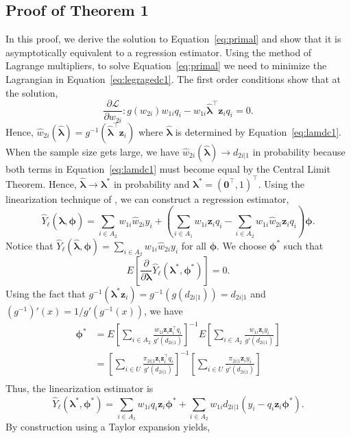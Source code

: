\documentclass[12pt]{article}
\renewcommand{\bf}[1]{\mathbf{#1}}
\begin{document}
\subsection{Proof of Theorem 1}

In this proof, we derive the solution to Equation~\ref{eq:primal} and show
that it is asymptotically equivalent to a regression estimator. Using the
method of Lagrange multipliers, to solve Equation~\eqref{eq:primal} we need to
minimize the Lagrangian in Equation~\eqref{eq:legragedc1}. 
The first order conditions show that at the solution,
$$
\frac{\partial \mathcal{L}}{\partial w_{2i}}: g(w_{2i}) w_{1i}q_i -
w_{1i} \hat{\bm \lambda}^\top \bf z_i q_i = 0.
$$
Hence, $\hat w_{2i}(\hat{\bm \lambda}) = 
g^{-1}(\hat{\bm \lambda}^\top \bf z_i)$ where
$\hat{\bm \lambda}$ is determined by Equation~\eqref{eq:lamdc1}. When the
sample size gets large, we have $\hat w_{2i}(\hat{\bm \lambda}) \to
d_{2i|1}$ in probability because both terms in Equation~\eqref{eq:lamdc1} must
become equal by the Central Limit Theorem. Hence,
$\hat{\bm \lambda} \to \bm \lambda^*$ in probability and 
$\bm \lambda^* = (\bf 0^\top, 1)^\top$. 
Using the linearization technique of
\cite{randles1982asymptotic}, we can construct a regression estimator, 
$$
\hat Y_\ell(\hat{\bm \lambda}, \bm \phi) = 
\sum_{i \in A_2} w_{1i} \hat w_{2i} y_i + 
\left(\sum_{i \in A_1} w_{1i} \bm z_i q_i - \sum_{i \in A_2} w_{1i} 
\hat w_{2i} \bf z_i q_i\right)\bm \phi.
$$
Notice that $\hat Y_\ell(\hat{\bm \lambda}, \bm \phi) = \sum_{i \in A_2} w_{1i}
\hat w_{2i} y_i$ for all $\bm \phi$. We choose $\bm \phi^*$ such that
$$
E\left[\frac{\partial}{\partial \bm \lambda} \hat Y_\ell(\bm \lambda^*,
\bm \phi^*)\right]=0.
$$
Using the fact that $g^{-1}(\bm \lambda^* \bf z_i) = g^{-1}(g(d_{2i|1})) = d_{2i|1}$
and $(g^{-1})'(x) = 1 / g'(g^{-1}(x))$, we have
\begin{align*}
  \bm \phi^*
  &= E\left[\sum_{i \in A_2} \frac{w_{1i}\bf z_i \bf z_i^\top q_i}{g'(d_{2i|1})}
  \right]^{-1}
  E\left[\sum_{i \in A_2} \frac{w_{1i}\bf z_i y_i}{g'(d_{2i|1})}\right]\\
  &= \left[\sum_{i \in U} \frac{\pi_{2i|1} \bf z_i \bf z_i^\top q_i}{g'(d_{2i|1})}
  \right]^{-1}
  \left[\sum_{i \in U} \frac{\pi_{2i|1} \bf z_i y_i}{g'(d_{2i|1})}\right]\\
\end{align*}
Thus, the linearization estimator is
$$\hat Y_\ell(\bm \lambda^*, \bm \phi^*) = 
\sum_{i \in A_1} w_{1i} q_i \bf z_i \bm \phi^* +
\sum_{i \in A_2} w_{1i} d_{2i|1} (y_i - q_i \bf z_i \bm \phi^*).$$
By construction using a Taylor expansion yields,
\end{document}

